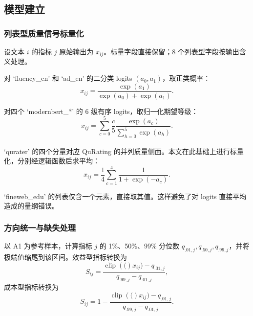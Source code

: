 \documentclass[bwprint]{gmcmthesis}
\newcommand{\clip}[1]{\operatorname{clip}\left(#1\right)}
\numberwithin{equation}{section}
\numberwithin{figure}{section}
\numberwithin{table}{section}
\begin{document}
    
    \subsection{模型建立}   %
        \subsubsection{列表型质量信号标量化}  %
        设文本 $i$ 的指标 $j$ 原始输出为 $x_{ij}$。标量字段直接保留；8 个列表型字段按输出含义处理。

        对 `fluency\_en' 和 `ad\_en' 的二分类 logits $(a_0,a_1)$，取正类概率：
        \begin{equation}
        x_{ij}=\frac{\exp(a_1)}{\exp(a_0)+\exp(a_1)}.
        \label{eq:binary}
        \end{equation}
        
        对四个 `modernbert\_*' 的 6 级有序 logits，取归一化期望等级：
        \begin{equation}
        x_{ij}=\sum_{c=0}^{5}\frac{c}{5}
        \frac{\exp(a_c)}{\sum_{h=0}^{5}\exp(a_h)}.
        \label{eq:ordinal}
        \end{equation}
        
        `qurater' 的四个分量对应 QuRating 的并列质量侧面\textsuperscript{\cite{wettig2024qurating}}。本文在此基础上进行标量化，分别经逻辑函数后求平均：
        \begin{equation}
        x_{ij}=\frac{1}{4}\sum_{c=1}^{4}\frac{1}{1+\exp(-a_c)}.
        \label{eq:qurater}
        \end{equation}
        
        `fineweb\_edu' 的列表仅含一个元素，直接取其值。这样避免了对 logits 直接平均造成的量纲错误。


        \subsubsection{方向统一与缺失处理}   %
        以 A1 为参考样本，计算指标 $j$ 的 1\%、50\%、99\% 分位数 $q_{.01,j},q_{.50,j},q_{.99,j}$，并将极端值缩尾到该区间。效益型指标转换为
        \begin{equation}
        S_{ij}=\frac{\clip(x_{ij})-q_{.01,j}}{q_{.99,j}-q_{.01,j}},
        \label{eq:benefit}
        \end{equation}
        成本型指标转换为
        \begin{equation}
        S_{ij}=1-\frac{\clip(x_{ij})-q_{.01,j}}{q_{.99,j}-q_{.01,j}}.
        \label{eq:cost}
        \end{equation}
        
\end{document}
